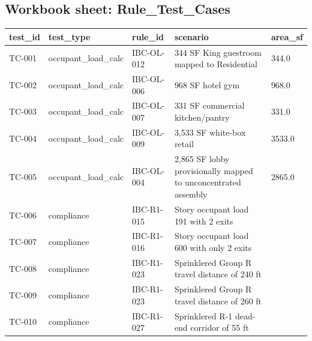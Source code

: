 \documentclass[10pt]{article}
\begin{document}
{\subsection*{Workbook sheet: Rule\_Test\_Cases}
\begin{longtable}{p{3.12cm}p{3.12cm}p{3.12cm}p{3.12cm}p{3.12cm}}
\toprule
\textbf{test\_id} & \textbf{test\_type} & \textbf{rule\_id} & \textbf{scenario} & \textbf{area\_sf} \\ \midrule \endhead
TC-001 & occupant\_load\_calc & IBC-OL-012 & 344 SF King guestroom mapped to Residential & 344.0 \\
TC-002 & occupant\_load\_calc & IBC-OL-006 & 968 SF hotel gym & 968.0 \\
TC-003 & occupant\_load\_calc & IBC-OL-007 & 331 SF commercial kitchen/pantry & 331.0 \\
TC-004 & occupant\_load\_calc & IBC-OL-009 & 3,533 SF white-box retail & 3533.0 \\
TC-005 & occupant\_load\_calc & IBC-OL-004 & 2,865 SF lobby provisionally mapped to unconcentrated assembly & 2865.0 \\
TC-006 & compliance & IBC-R1-015 & Story occupant load 191 with 2 exits &  \\
TC-007 & compliance & IBC-R1-016 & Story occupant load 600 with only 2 exits &  \\
TC-008 & compliance & IBC-R1-023 & Sprinklered Group R travel distance of 240 ft &  \\
TC-009 & compliance & IBC-R1-023 & Sprinklered Group R travel distance of 260 ft &  \\
TC-010 & compliance & IBC-R1-027 & Sprinklered R-1 dead-end corridor of 55 ft &  \\
\bottomrule\end{longtable}}
\end{document}
